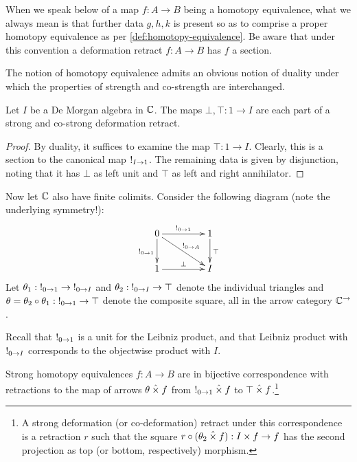 \documentclass[reqno,10pt,a4paper,oneside]{amsart}
\begin{document}
When we speak below of a map $f : A \to B$ being a homotopy equivalence, what we always mean is that further data $g, h, k$ is present so as to comprise a proper homotopy equivalence as per \cref{def:homotopy-equivalence}.
Be aware that under this convention a deformation retract $f : A \to B$ has $f$ a section.

The notion of homotopy equivalence admits an obvious notion of duality under which the properties of strength and co-strength are interchanged.

\begin{example}
\label{de-morgan-deformation-retract}
Let $I$ be a De Morgan algebra in $\mathbb{C}$.
The maps $\bot, \top : 1 \to I$ are each part of a strong and co-strong deformation retract.
\end{example}

\begin{proof}
By duality, it suffices to examine the map $\top : 1 \to I$.
Clearly, this is a section to the canonical map $\mathord{!}_{I \to 1}$.
The remaining data is given by disjunction, noting that it has $\bot$ as left unit and $\top$ as left and right annihilator.
\end{proof}

Now let $\mathbb{C}$ also have finite colimits.
Consider the following diagram (note the underlying symmetry!):
\[
\xymatrix@C+2em{
  0
  \ar[r]^{\canonical_{0 \to 1}}
  \ar[d]_{\canonical_{0 \to 1}}
  \ar[dr]^{\canonical_{0 \to A}}
&
  1
  \ar[d]^{\top}
\\
  1
  \ar[r]^{\bot}
&
  I
}
\]
Let $\theta_1 : \mathord{!}_{0 \to 1} \to \mathord{!}_{0 \to I}$ and $\theta_2 : \mathord{!}_{0 \to I} \to \top$ denote the individual triangles and $\theta = \theta_2 \mathbin{\circ} \theta_1 : \mathord{!}_{0 \to 1} \to \top$ denote the composite square, all in the arrow category $\mathbb{C}^{\to}$.

Recall that $\mathord{!}_{0 \to 1}$ is a unit for the Leibniz product, and that Leibniz product with $\mathord{!}_{0 \to I}$ corresponds to the objectwise product with $I$. 

\begin{lemma}
\label{strong-h-equiv-same-as-retraction}
Strong homotopy equivalences $f : A \to B$ are in bijective correspondence with retractions to the map of arrows $\theta \mathbin{\hat{\times}} f$ from $\mathord{!}_{0 \to 1} \mathbin{\hat{\times}} f$ to $\top \mathbin{\hat{\times}} f$.\footnote{
A strong deformation (or co-deformation) retract under this correspondence is a retraction $r$ such that the square $r \mathbin{\circ} (\theta_2 \mathbin{\hat{\times}} f) : I \times f \to f$ has the second projection as top (or bottom, respectively) morphism.
}
\end{lemma}
\end{document}
